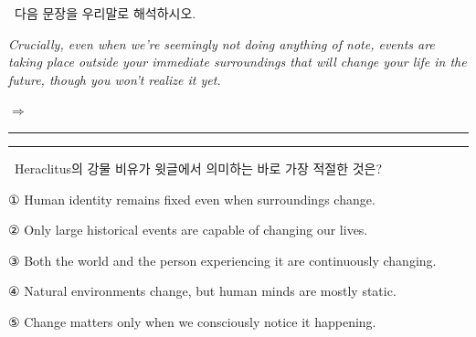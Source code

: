 \documentclass[11pt,a4paper]{article}
\newcommand{\qno}[1]{\par\vspace{8pt}\noindent{\sffamily\bfseries #1.}\ }
\newcommand{\instr}[1]{{\sffamily #1}\par\vspace{3pt}}
\begin{document}
\qno{3}\instr{[서술형] 다음 문장을 우리말로 해석하시오.}
\vspace{2pt}\par\noindent
\hspace{1em}\textit{Crucially, even when we're seemingly not doing anything of note, events are taking place outside your immediate surroundings that will change your life in the future, though you won't realize it yet.}
\par\vspace{6pt}\noindent
$\Rightarrow$ \rule{\linewidth}{0.4pt}
\par\vspace{4pt}\noindent
\rule{\linewidth}{0.4pt}

\qno{4}\instr{Heraclitus의 강물 비유가 윗글에서 의미하는 바로 가장 적절한 것은?}
\begin{choices}
\item ① Human identity remains fixed even when surroundings change.
\item ② Only large historical events are capable of changing our lives.
\item ③ Both the world and the person experiencing it are continuously changing.
\item ④ Natural environments change, but human minds are mostly static.
\item ⑤ Change matters only when we consciously notice it happening.
\end{choices}
\end{document}
